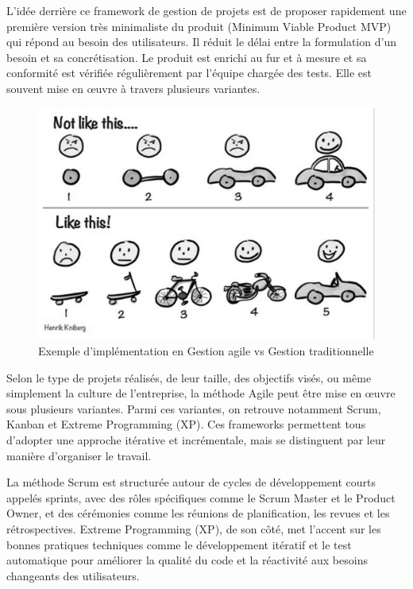 {\vspace{0.3cm}

L'idée derrière ce framework de gestion de projets est de proposer rapidement une première version très minimaliste du produit (Minimum Viable Product MVP) qui répond au besoin des utilisateurs. Il réduit le délai entre la formulation d’un besoin et sa concrétisation. Le produit est enrichi au fur et à mesure et sa conformité est vérifiée régulièrement par l'équipe chargée des tests. Elle est souvent mise en œuvre à travers plusieurs variantes.

\vspace{0.35cm}
\begin{figure}[H]
\begin{center}
\includegraphics[width=15cm]{assets/presentation/3_mvp.png}
\end{center}
\caption{Exemple d'implémentation en Gestion agile vs Gestion traditionnelle}
\end{figure}

\vspace{0.35cm}

Selon le type de projets réalisés, de leur taille, des objectifs visés, ou même simplement la culture de l'entreprise, la méthode Agile peut être mise en œuvre sous plusieurs variantes. Parmi ces variantes, on retrouve notamment Scrum, Kanban et Extreme Programming (XP). Ces frameworks permettent tous d'adopter une approche itérative et incrémentale, mais se distinguent par leur manière d'organiser le travail.

\vspace{0.3cm}

La méthode Scrum est structurée autour de cycles de développement courts appelés sprints, avec des rôles spécifiques comme le Scrum Master et le Product Owner, et des cérémonies comme les réunions de planification, les revues et les rétrospectives. Extreme Programming (XP), de son côté, met l’accent sur les bonnes pratiques techniques comme le développement itératif et le test automatique pour améliorer la qualité du code et la réactivité aux besoins changeants des utilisateurs.

}
